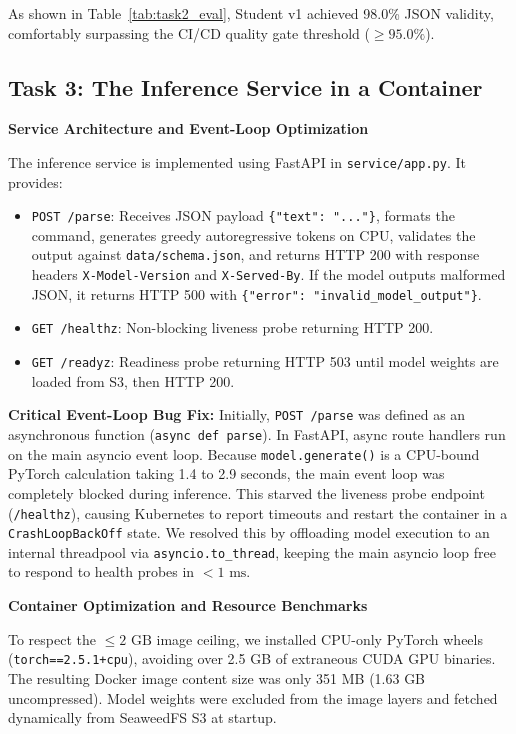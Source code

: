 \documentclass[10pt,a4paper]{article}
\begin{document}
As shown in Table~\ref{tab:task2_eval}, Student v1 achieved 98.0\% JSON validity, comfortably surpassing the CI/CD quality gate threshold ($\ge 95.0\%$).

\subsection*{Task 3: The Inference Service in a Container}

\textbf{Service Architecture and Event-Loop Optimization}

The inference service is implemented using FastAPI in \texttt{service/app.py}. It provides:
\begin{itemize}
    \item \texttt{POST /parse}: Receives JSON payload \texttt{\{"text": "..."\}}, formats the command, generates greedy autoregressive tokens on CPU, validates the output against \texttt{data/schema.json}, and returns HTTP 200 with response headers \texttt{X-Model-Version} and \texttt{X-Served-By}. If the model outputs malformed JSON, it returns HTTP 500 with \texttt{\{"error": "invalid\_model\_output"\}}.
    \item \texttt{GET /healthz}: Non-blocking liveness probe returning HTTP 200.
    \item \texttt{GET /readyz}: Readiness probe returning HTTP 503 until model weights are loaded from S3, then HTTP 200.
\end{itemize}

\textbf{Critical Event-Loop Bug Fix:} Initially, \texttt{POST /parse} was defined as an asynchronous function (\texttt{async def parse}). In FastAPI, async route handlers run on the main asyncio event loop. Because \texttt{model.generate()} is a CPU-bound PyTorch calculation taking 1.4 to 2.9 seconds, the main event loop was completely blocked during inference. This starved the liveness probe endpoint (\texttt{/healthz}), causing Kubernetes to report timeouts and restart the container in a \texttt{CrashLoopBackOff} state. We resolved this by offloading model execution to an internal threadpool via \texttt{asyncio.to\_thread}, keeping the main asyncio loop free to respond to health probes in $< 1\text{ ms}$.

\textbf{Container Optimization and Resource Benchmarks}

To respect the $\le 2\text{ GB}$ image ceiling, we installed CPU-only PyTorch wheels (\texttt{torch==2.5.1+cpu}), avoiding over 2.5 GB of extraneous CUDA GPU binaries. The resulting Docker image content size was only 351 MB (1.63 GB uncompressed). Model weights were excluded from the image layers and fetched dynamically from SeaweedFS S3 at startup.
\end{document}
